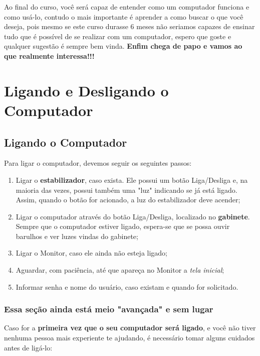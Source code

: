 \documentclass[hidelinks,12pt]{article}
\begin{document}
 Ao final do curso, você será capaz de entender como um computador funciona e como usá-lo, contudo o mais importante é aprender a como buscar o que você deseja, pois mesmo se este curso durasse 6 meses não seriamos capazes de ensinar tudo que é possível de se realizar com um computador, espero que goste e qualquer sugestão é sempre bem vinda. \textbf{Enfim chega de papo e vamos ao que realmente interessa!!!}


\section{Ligando e Desligando o Computador}
\subsection{Ligando o Computador}
	
Para ligar o computador, devemos seguir os seguintes passos:
	
\begin{enumerate}
	\item Ligar o \textbf{estabilizador}, caso exista. Ele possui um botão Liga/Desliga e, na maioria das vezes, possui também uma "luz" indicando se já está ligado. Assim, quando o botão for acionado, a luz do estabilizador deve acender;

	\item Ligar o computador através do botão Liga/Desliga, localizado no \textbf{gabinete}. Sempre que o computador estiver ligado, espera-se que se possa ouvir barulhos e ver luzes vindas do gabinete;

    \item Ligar o Monitor, caso ele ainda não esteja ligado;

	\item Aguardar, com paciência, até que apareça no Monitor a \emph{tela inicial};

	\item Informar senha e nome do usuário, caso existam e quando for solicitado.
\end{enumerate}


\subsubsection{Essa seção ainda está meio "avançada" e sem lugar}

Caso for a \textbf{primeira vez que o seu computador será ligado}, e você não tiver nenhuma pessoa mais experiente te ajudando, é necessário tomar alguns cuidados antes de ligá-lo:
\end{document}
